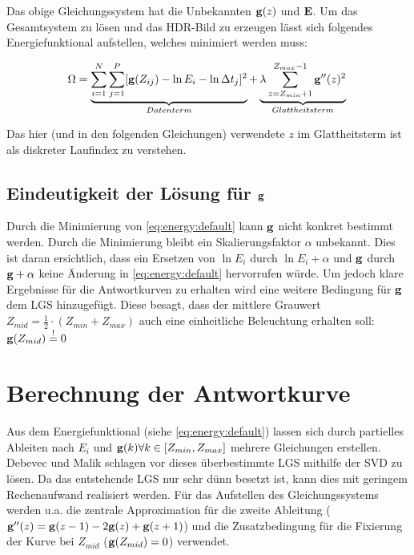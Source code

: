 Das obige Gleichungssystem hat die Unbekannten $\mathbf g(z)$ und $\mathbf E$. Um das Gesamtsystem zu lösen und das \gls{HDR}-Bild zu erzeugen lässt sich folgendes Energiefunktional aufstellen, welches minimiert werden muss:

\begin{equation}
\label{eq:energy:default}
\Omega = \underbrace{\sum \limits_{i=1}^{N} \sum \limits_{j=1}^{P}[\mathbf g(Z_{ij}) - \ln E_i - \ln \Delta t_j]^2}_{Datenterm} + \underbrace{\lambda  \sum \limits_{z=Z_{min}+1}^{Z_{max}-1} \mathbf{g}''(z)^2}_{Glattheitsterm}\\
\end{equation}

Das hier (und in den folgenden Gleichungen) verwendete $z$ im Glattheitsterm ist als diskreter Laufindex zu verstehen. 

\subsection{Eindeutigkeit der Lösung für $\mathbf g$}
\label{sec:eindeutigkeit}
Durch die Minimierung von \autoref{eq:energy:default} kann $\mathbf g$ nicht konkret bestimmt werden. Durch die Minimierung bleibt ein Skalierungsfaktor $\alpha$ unbekannt. Dies ist daran ersichtlich, dass ein Ersetzen von $\ln E_i$ durch $\ln E_i + \alpha$ und $\mathbf g$ durch $\mathbf g + \alpha$ keine Änderung in \autoref{eq:energy:default} hervorrufen würde. Um jedoch klare Ergebnisse für die Antwortkurven zu erhalten wird eine weitere Bedingung für $\mathbf g$ dem \gls{LGS} hinzugefügt. Diese besagt, dass der mittlere Grauwert $Z_{mid} = \frac{1}{2}\cdot(Z_{min}+Z_{max})$ auch eine einheitliche Beleuchtung erhalten soll: $\mathbf g(Z_{mid}) \overset{!}{=} 0$

\section{Berechnung der Antwortkurve}
Aus dem Energiefunktional (siehe \autoref{eq:energy:default}) lassen sich durch partielles Ableiten nach $E_i$ und $\mathbf g(k) \forall k \in [Z_{min}, Z_{max}]$ mehrere Gleichungen erstellen. Debevec und Malik schlagen vor dieses überbestimmte \gls{LGS} mithilfe der \gls{SVD} zu lösen. Da das entstehende \gls{LGS} nur sehr dünn besetzt ist, kann dies mit geringem Rechenaufwand realisiert werden. Für das Aufstellen des Gleichungssystems werden u.a. die zentrale Approximation für die zweite Ableitung ($\mathbf{g}''(z) = \mathbf g(z-1)-2\mathbf g(z)+\mathbf g(z+1)$) und die Zusatzbedingung für die Fixierung der Kurve bei $Z_{mid}$ ($\mathbf g (Z_{mid}) = 0$) verwendet.


